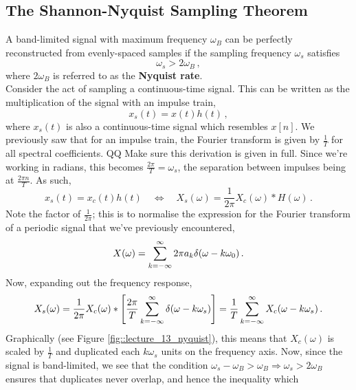 \subsection{The Shannon-Nyquist Sampling Theorem}
%
A band-limited signal with maximum frequency $\omega_B$ can be perfectly
reconstructed from evenly-spaced samples if the sampling frequency
$\omega_s$ satisfies
%
\begin{equation}
  \omega_s > 2\omega_B \,,
\end{equation}
%
where $2\omega_B$ is referred to as the \textbf{Nyquist rate}.\\

Consider the act of sampling a continuous-time signal. This can be
written as the multiplication of the signal with an impulse train,
%
\begin{displaymath}
  x_s(t) = x(t) h(t) \,,
\end{displaymath}
%
where $x_s(t)$ is also a continuous-time signal which resembles
$x[n]$. We previously saw that for an impulse train, the Fourier
transform is given by $\frac{1}{T}$ for all spectral coefficients.
QQ Make sure this derivation is given in full.
Since we're working in radians, this becomes $\frac{2\pi}{T} = \omega_s$,
the separation between impulses being at $\frac{2\pi n}{T}$. As such,
%
\begin{displaymath}
  x_s(t) = x_c(t) h(t) \quad\Longleftrightarrow\quad
  X_s(\omega) = \frac{1}{2\pi}X_c(\omega) * H(\omega) \,.
\end{displaymath}
%
Note the factor of $\frac{1}{2\pi}$; this is to normalise the expression
for the Fourier transform of a periodic signal that we've previously
encountered,
%
\begin{displaymath}
  X(\omega) = \sum_{k=-\infty}^\infty2\pi a_k\delta(\omega-k\omega_0) \,.
\end{displaymath}
%
Now, expanding out the frequency response,
%
\begin{displaymath}
  X_s(\omega) = \frac{1}{2\pi}X_c(\omega) * \left[
    \frac{2\pi}{T}\sum_{k=-\infty}^\infty\delta(\omega - k\omega_s)
  \right] = \frac{1}{T}\sum_{k=-\infty}^\infty X_c(\omega-k\omega_s) \,.
\end{displaymath}
%
Graphically (see Figure \ref{fig::lecture_13_nyquist}),
this means that $X_c(\omega)$ is scaled by
$\frac{1}{T}$ and duplicated each $k\omega_s$ units on the frequency axis.
Now, since the signal is band-limited, we see that the condition
$\omega_s - \omega_B > \omega_B \Longrightarrow \omega_s > 2\omega_B$
ensures that duplicates never overlap, and hence the inequality which
